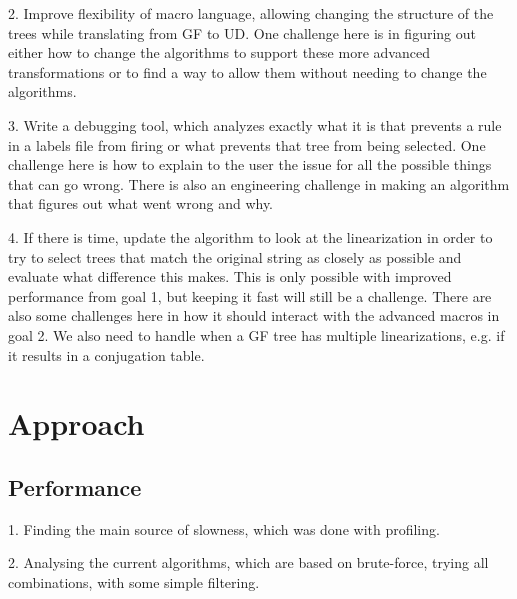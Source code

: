 \documentclass{article}
\begin{document}
2. Improve flexibility of macro language, allowing changing the structure of the trees while translating from GF to UD. One challenge here is in figuring out either how to change the algorithms to support these more advanced transformations or to find a way to allow them without needing to change the algorithms.

3. Write a debugging tool, which analyzes exactly what it is that prevents a rule in a labels file from firing or what prevents that tree from being selected.
One challenge here is how to explain to the user the issue for all the possible things that can go wrong.
There is also an engineering challenge in making an algorithm that figures out what went wrong and why.

4. If there is time, update the algorithm to look at the linearization in order to try to select trees that match the original string as closely as possible and evaluate what difference this makes. This is only possible with improved performance from goal 1, but keeping it fast will still be a challenge. There are also some challenges here in how it should interact with the advanced macros in goal 2. We also need to handle when a GF tree has multiple linearizations, e.g. if it results in a conjugation table.





\section{Approach}

\subsection{Performance}

1. Finding the main source of slowness, which was done with profiling.

2. Analysing the current algorithms, which are based on brute-force, trying all combinations, with some simple filtering.
\end{document}
